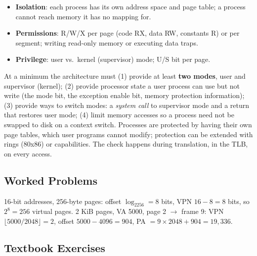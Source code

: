 \begin{itemize}
  \item \textbf{Isolation}: each process has its own address space and page table;
  a process cannot reach memory it has no mapping for.
  \item \textbf{Permissions}: R/W/X per page (code RX, data RW, constants R) or per
  segment; writing read-only memory or executing data traps.
  \item \textbf{Privilege}: user vs.\ kernel (supervisor) mode; U/S bit per page.
\end{itemize}
At a minimum the architecture must (1) provide at least \textbf{two modes},
user and supervisor (kernel); (2) provide processor state a user process can use
but not write (the mode bit, the exception enable bit, memory protection
information); (3) provide ways to switch modes: a \emph{system call} to supervisor
mode and a return that restores user mode; (4) limit memory accesses so a process
need not be swapped to disk on a context switch. Processes are
protected by having their own page tables, which user programs cannot modify;
protection can be extended with rings (80x86) or capabilities. The check happens
during translation, in the TLB, on every access.

\subsection{Worked Problems}
\label{sec:vm-problems}

\begin{eg}
16-bit addresses, 256-byte pages: offset $\log_2256=8$ bits, VPN $16-8=8$ bits, so
$2^8=256$ virtual pages. 2 KiB pages, VA 5000, page 2 $\to$ frame 9: VPN
$\lfloor5000/2048\rfloor=2$, offset $5000-4096=904$, PA $=9\times2048+904=19{,}336$.
\end{eg}

\subsection{Textbook Exercises}
\label{sec:vm-tbx}


